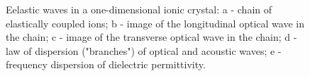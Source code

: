 \documentclass[a4paper,14pt]{extreport}
\begin{document}
\begin{figure}[h]
\caption{Eelastic waves in a one-dimensional ionic crystal: a - chain of elastically coupled ions; b - image of the longitudinal optical wave in the chain; c - image of the transverse optical wave in the chain; d - law of dispersion ("branches") of optical and acoustic waves; e - frequency dispersion of dielectric permittivity.}
\label{ris1}
\end{figure}
\end{document}

